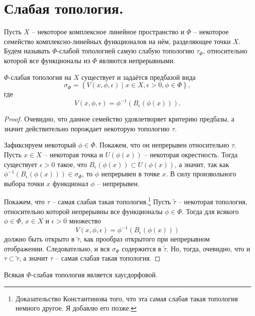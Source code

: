 \section{Слабая топология.}\label{seq:weak-topology}
\begin{definition}
    Пусть $X$ -- некоторое комплексное линейное пространство и $\Phi$ -- некоторое семейство комплексно-линейных функционалов на нём, разделяющее точки $X$.
    Будем называть $\Phi$-слабой топологией самую слабую топологию $\tau_{\Phi}$, относительно которой все функционалы из $\Phi$ являются непрерывными.
\end{definition}
\begin{proposition}
    $\Phi$-слабая топология на $X$ существует и задаётся предбазой вида
    \[
        \sigma_\Phi = \left\{V(x, \phi, \epsilon) \mid x \in X, \epsilon > 0, \phi \in \Phi\right\},
    \]
    где
    \[
        V(x, \phi, \epsilon) = \phi^{-1}\left(B_\epsilon(\phi(x))\right).
    \]
\end{proposition}
\begin{proof}
    Очевидно, что данное семейство удовлетворяет критерию предбазы, а значит действительно порождает некоторую топологию $\tau$.

    Зафиксируем некоторый $\phi \in \Phi$.
    Покажем, что он непрерывен относительно $\tau$.
    Пусть $x \in X$ -- некоторая точка и $U(\phi(x))$ -- некоторая окрестность.
    Тогда существует $\epsilon > 0$ такое, что $B_\epsilon(\phi(x)) \subset U(\phi(x))$, а значит, так как $\phi^{-1}(B_\epsilon(\phi(x))) \in \sigma_\Phi$, то $\phi$ непрерывен в точке $x$.
    В силу произвольного выбора точки $x$ функционал $\phi$ -- непрерывен.

    Покажем, что $\tau$ -- самая слабая такая топология.\footnote{Доказательство Константинова того, что эта самая слабая такая топология немного другое. Я добавлю его позже.}
    Пусть $\tilde{\tau}$ -- некоторая топология, относительно которой непрерывны все функционалы $\phi \in \Phi$.
    Тогда для всякого $\phi \in \Phi$, $x \in X$ и $\epsilon > 0$ множество
    \[
        V(x, \phi, \epsilon) = \phi^{-1}(B_\epsilon(\phi(x)))
    \]
    должно быть открыто в $\tilde{\tau}$, как прообраз открытого при непрерывном отображении.
    Следовательно, и вся $\sigma_\Phi$ содержится в $\tilde{\tau}$.
    Но, тогда, очевидно, что и $\tau \subset \tilde{\tau}$, а значит $\tau$ -- самая слабая такая топология.
\end{proof}
\begin{proposition}
    Всякая $\Phi$-слабая топология является хаусдорфовой.
\end{proposition}
